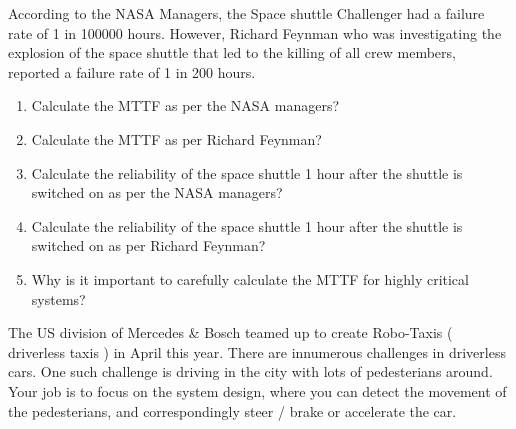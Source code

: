 



According to the NASA Managers, the Space shuttle Challenger had a failure rate of 1 in 100000 hours. However, Richard Feynman who was investigating the explosion of the space shuttle that led to the killing of all crew members, reported a failure rate of 1 in 200 hours.

\begin{enumerate}
\item Calculate the MTTF as per the NASA managers?
\item Calculate the MTTF as per Richard Feynman?
\item Calculate the reliability of the space shuttle 1 hour after the shuttle is switched on as per the NASA managers?
\item Calculate the reliability of the space shuttle 1 hour after the shuttle is switched on as per Richard Feynman?
\item Why is it important to carefully calculate the MTTF for highly critical systems?
\end{enumerate}


\pagebreak


The US division of Mercedes \& Bosch teamed up to create Robo-Taxis ( driverless taxis ) in April this year. There are innumerous challenges in driverless cars.
One such challenge is driving in the city with lots of pedesterians around. Your job is to focus on the system design, where you can detect the movement of the pedesterians,
and correspondingly steer / brake or accelerate the car. 

